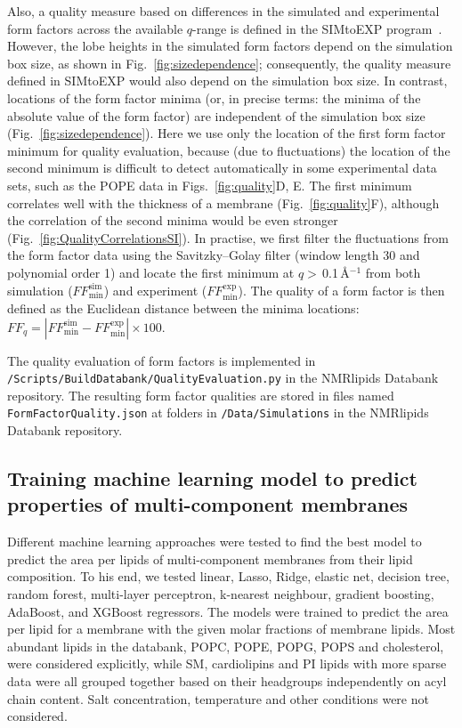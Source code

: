 \documentclass[fleqn,10pt]{wlscirep}
\begin{document}
Also, a quality measure based on differences in the simulated and experimental form factors across the available $q$-range is defined in the SIMtoEXP program~\cite{kucerka10}. However, the lobe heights in the simulated form factors depend on the simulation box size, as shown in Fig.~\ref{fig:sizedependence}; consequently, the quality measure defined in SIMtoEXP  would also depend on the simulation box size. In contrast, locations of the form factor minima (or, in precise terms: the minima of the absolute value of the form factor) are independent of the simulation box size (Fig.~\ref{fig:sizedependence}).
Here we use only the location of the first form factor minimum for quality evaluation,
because (due to fluctuations) the location of the second minimum is difficult to detect automatically in some experimental data sets, such as the POPE data in Figs.~\ref{fig:quality}D, E.
The first minimum correlates well with the thickness of a membrane (Fig.~\ref{fig:quality}F), although the correlation of the second minima would be even stronger (Fig.~\ref{fig:QualityCorrelationsSI}).
In practise, we first filter the fluctuations from the form factor data using the Savitzky--Golay filter (window length 30 and polynomial order 1) and locate the first minimum at  $q>$\,0.1\,\AA$^{-1}$ from both simulation ($F\!F_\mathrm{min}^\mathrm{sim}$) and experiment ($F\!F_\mathrm{min}^\mathrm{exp}$).
The quality of a form factor is then defined as the Euclidean distance between the minima locations: $F\!F_q = |F\!F_\mathrm{min}^\mathrm{sim}-F\!F_\mathrm{min}^\mathrm{exp}| \times 100$. 

The quality evaluation of form factors is implemented in \texttt{/Scripts/BuildDatabank/QualityEvaluation.py} in the NMRlipids Databank repository. The resulting form factor qualities are stored in files named \texttt{FormFactorQuality.json} at folders in \texttt{/Data/Simulations} in the NMRlipids Databank repository.


\subsection{Training machine learning model to predict properties of multi-component membranes}
Different machine learning approaches were tested to find the best model to predict the area per lipids of multi-component membranes  from their lipid composition. To his end, we tested linear, Lasso, Ridge, elastic net, decision tree, random forest, multi-layer perceptron, k-nearest neighbour, gradient boosting, AdaBoost, and XGBoost regressors. The models were trained to predict the area per lipid for a membrane with the given molar fractions of membrane lipids. Most abundant lipids in the databank, POPC, POPE, POPG, POPS and cholesterol, were considered explicitly, while SM, cardiolipins and PI lipids with  more sparse data were all grouped together based on their headgroups independently on acyl chain content. Salt concentration, temperature and other conditions were not considered. 
\end{document}
